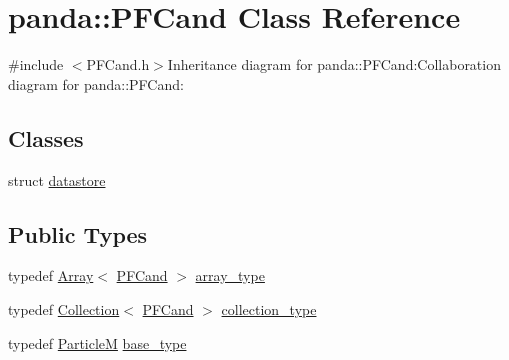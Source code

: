 \hypertarget{classpanda_1_1PFCand}{
\section{panda::PFCand Class Reference}
\label{classpanda_1_1PFCand}
}


{\ttfamily \#include $<$PFCand.h$>$}Inheritance diagram for panda::PFCand:Collaboration diagram for panda::PFCand:\subsection*{Classes}
\begin{DoxyCompactItemize}
\item 
struct \hyperlink{structpanda_1_1PFCand_1_1datastore}{datastore}
\end{DoxyCompactItemize}
\subsection*{Public Types}
\begin{DoxyCompactItemize}
\item 
typedef \hyperlink{classpanda_1_1Array}{Array}$<$ \hyperlink{classpanda_1_1PFCand}{PFCand} $>$ \hyperlink{classpanda_1_1PFCand_aea303dd18044eafc5ea0953e22f2f095}{array\_\-type}
\item 
typedef \hyperlink{classpanda_1_1Collection}{Collection}$<$ \hyperlink{classpanda_1_1PFCand}{PFCand} $>$ \hyperlink{classpanda_1_1PFCand_a6f3fdf6ad51952f9995adb1111fec3bc}{collection\_\-type}
\item 
typedef \hyperlink{classpanda_1_1ParticleM}{ParticleM} \hyperlink{classpanda_1_1PFCand_a2c9c280056db9b280276ec15926e7043}{base\_\-type}
\end{DoxyCompactItemize}

